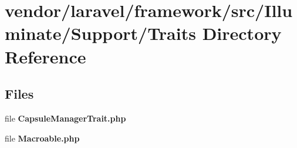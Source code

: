 \section{vendor/laravel/framework/src/\+Illuminate/\+Support/\+Traits Directory Reference}
\label{dir_8221a418c7134ffafb85912593b5085c}
\subsection*{Files}
\begin{DoxyCompactItemize}
\item 
file {\bf Capsule\+Manager\+Trait.\+php}
\item 
file {\bf Macroable.\+php}
\end{DoxyCompactItemize}
